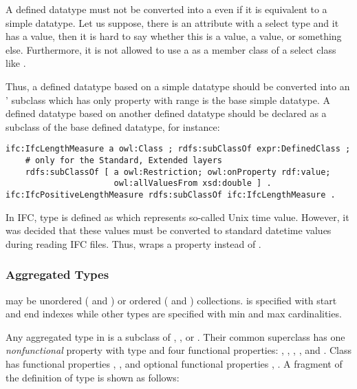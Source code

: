A defined data\-type must not be converted into a  even if it is equivalent to a simple data\-type. Let us suppose, there is an attribute with a select type  and it has a  value, then it is hard to say whether this is a  value, a  value, or something else. Furthermore, it is not allowed to use a  as a member class of a select class like . 

Thus, a defined data\-type based on a simple data\-type should be converted into an ' subclass which has only property  with range is the base simple data\-type. A defined data\-type based on another defined data\-type should be declared as a subclass of the base defined data\-type, for instance:

\begin{lstlisting}
ifc:IfcLengthMeasure a owl:Class ; rdfs:subClassOf expr:DefinedClass ;
    # only for the Standard, Extended layers
    rdfs:subClassOf [ a owl:Restriction; owl:onProperty rdf:value;
                      owl:allValuesFrom xsd:double ] .
ifc:IfcPositiveLengthMeasure rdfs:subClassOf ifc:IfcLengthMeasure .
\end{lstlisting}

In IFC, type  is defined as  which represents so-called Unix time value. However, it was decided that these values must be converted to standard datetime values during reading IFC files. Thus,  wraps a  property instead of .



\subsubsection{Aggregated Types} may be unordered ( and ) or  ordered ( and ) collections. %
 is specified with start and end indexes while other types are specified with min and max cardinalities.

Any aggregated type in \ifcowl{} is a subclass of ,
,  or . Their common superclass  has one \emph{nonfunctional} property  with type  and four functional properties: , , , , and . Class  has functional properties , , and optional functional properties , . A fragment of the definition of type  is shown as follows:

